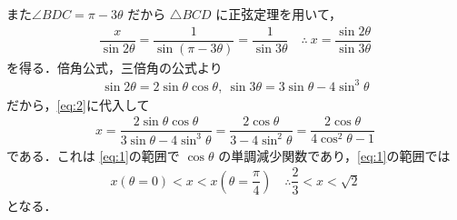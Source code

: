 \documentclass[../../main.tex]{subfiles}
\begin{document}
また$\angle BDC = \pi-3\theta$ だから $\triangle BCD$ に正弦定理を用いて，
\begin{align}
  \dfrac{x}{\sin2\theta}=\dfrac{1}{\sin(\pi-3\theta)}=\dfrac{1}{\sin3\theta} \quad\therefore\ x=\dfrac{\sin2\theta}{\sin3\theta} \label{eq:2}
\end{align}
を得る．倍角公式，三倍角の公式より
\begin{align}
  \sin2\theta=2\sin\theta\cos\theta,\ \sin3\theta=3\sin\theta-4\sin^3\theta \label{eq:3}
\end{align}
だから，\cref{eq:2}に代入して
\begin{align}
  x=\dfrac{2\sin\theta\cos\theta}{3\sin\theta-4\sin^3\theta}=\dfrac{2\cos\theta}{3-4\sin^2\theta}=\dfrac{2\cos\theta}{4\cos^2\theta-1}
\end{align}
である．これは \cref{eq:1}の範囲で $\cos\theta$ の単調減少関数であり，\cref{eq:1}の範囲では
\begin{align}
  x\left(\theta=0\right) < x < x\left(\theta=\dfrac{\pi}{4}\right)
  \quad\therefore
  \dfrac{2}{3}<x<\sqrt{2}
\end{align}
となる．

\newpage
\end{document}
